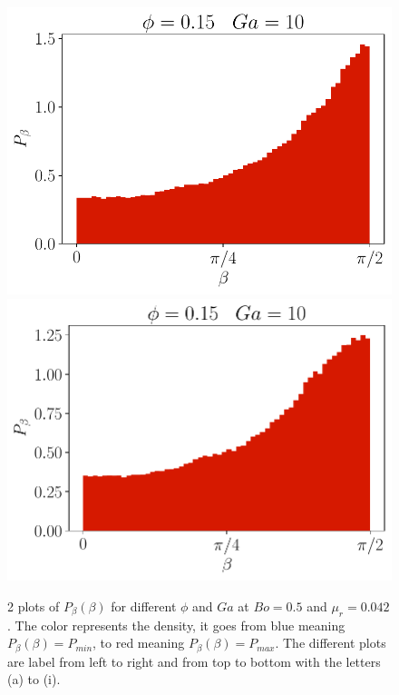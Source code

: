 \begin{figure}[h!]
    \includegraphics[height =\size]{image/N_10/beta/2DMAP_beta_dmin_10_Bo0_5PHI0_15mu_r0_42Ga10.pdf}
    \includegraphics[height =\size]{image/N_10/beta/2DMAP_beta_dmin_10_Bo1PHI0_15mu_r0_42Ga10.pdf}
    \caption{2 plots of $P_{\beta}(\beta)$ for different $\phi$ and $Ga$ at $Bo = 0.5$ and $\mu_r = 0.042$. The color represents the density, it goes from blue meaning $P_{\beta}(\beta)= P_{min}$, to red meaning $P_{\beta}(\beta) = P_{max}$. The different plots are label from left to right and from top to bottom with the letters (a) to (i).} 
    \label{fig:beta_bomu}
\end{figure} 